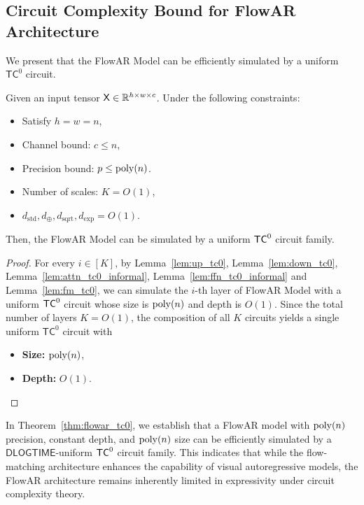 \subsection{Circuit Complexity Bound for FlowAR Architecture}\label{sec:main_result_flowar}
We present that the FlowAR Model can be efficiently simulated by a uniform $\mathsf{TC}^0$ circuit.
\begin{theorem}\label{thm:flowar_tc0}
Given an input tensor $\mathsf{X} \in \mathbb{R}^{h \times w \times c}$. Under the following constraints:
\begin{itemize}
    \item Satisfy $h = w = n$,
    \item Channel bound: $c \leq n$,
    \item Precision bound: $p \leq \operatorname{poly}(n)$.
    \item Number of scales: $K = O(1)$,
    \item $d_{\mathrm{std}},d_\oplus,d_{\mathrm{sqrt}},d_{\exp} = O(1)$.
\end{itemize}
Then, the FlowAR Model can be simulated by a uniform $\mathsf{TC}^0$ circuit family.

\end{theorem}
\begin{proof}
    For every $i \in [K]$, by Lemma~\ref{lem:up_tc0}, Lemma~\ref{lem:down_tc0},  Lemma~\ref{lem:attn_tc0_informal}, Lemma~\ref{lem:ffn_tc0_informal} and Lemma~\ref{lem:fm_tc0}, we can simulate the $i$-th layer of FlowAR Model with a uniform $\mathsf{TC}^0$ circuit whose size is $\operatorname{poly}(n)$ and depth is $O(1)$. Since the total number of layers $K = O(1)$, the composition of all $K$ circuits yields a single uniform $\mathsf{TC}^0$ circuit with
    \begin{itemize}
        \item {\bf Size:} $\operatorname{poly}(n)$,
        \item {\bf Depth: }$O(1)$.
    \end{itemize}
\end{proof}

In Theorem~\ref{thm:flowar_tc0}, we establish that a FlowAR model with $\operatorname{poly}(n)$ precision, constant depth, and $\operatorname{poly}(n)$ size can be efficiently simulated by a $\mathsf{DLOGTIME}$-uniform $\mathsf{TC}^0$ circuit family. This indicates that while the flow-matching architecture enhances the capability of visual autoregressive models, the FlowAR architecture remains inherently limited in expressivity under circuit complexity theory.